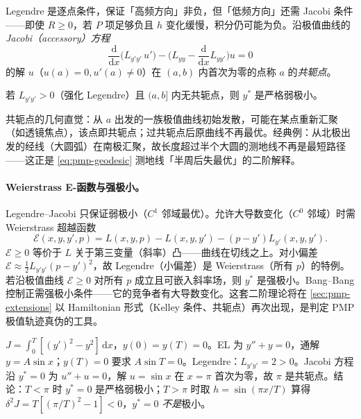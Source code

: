 Legendre 是逐点条件，保证「高频方向」非负，但「低频方向」还需 Jacobi 条件——即使 $R\ge0$，若 $P$ 项足够负且 $h$ 变化缓慢，积分仍可能为负。沿极值曲线的\emph{Jacobi（accessory）方程}
\begin{equation}
  \frac{\mathrm d}{\mathrm dx}\big(L_{y'y'}\,u'\big)-\Big(L_{yy}-\frac{\mathrm d}{\mathrm dx}L_{yy'}\Big)u=0
  \label{eq:pmp-jacobi}
\end{equation}
的解 $u$（$u(a)=0,u'(a)\ne0$）在 $(a,b)$ 内首次为零的点称 $a$ 的\emph{共轭点}。

\begin{theorem}\label{thm:pmp-jacobi}
若 $L_{y'y'}>0$（强化 Legendre）且 $(a,b]$ 内无共轭点，则 $y^\ast$ 是严格弱极小。
\end{theorem}

共轭点的几何直觉：从 $a$ 出发的一族极值曲线初始发散，可能在某点重新汇聚（如透镜焦点），该点即共轭点；过共轭点后原曲线不再最优。经典例：从北极出发的经线（大圆弧）在南极汇聚，故长度超过半个大圆的测地线不再是最短路径——这正是 \cref{eq:pmp-geodesic} 测地线「半周后失最优」的二阶解释。

\paragraph{Weierstrass E-函数与强极小。}
Legendre--Jacobi 只保证弱极小（$C^1$ 邻域最优）。允许大导数变化（$C^0$ 邻域）时需 Weierstrass 超越函数
\begin{equation}
  \mathcal E(x,y,y',p)=L(x,y,p)-L(x,y,y')-(p-y')L_{y'}(x,y,y').
  \label{eq:pmp-weierstrass}
\end{equation}
$\mathcal E\ge0$ 等价于 $L$ 关于第三变量（斜率）凸——曲线在切线之上。对小偏差 $\mathcal E\approx\tfrac12 L_{y'y'}(p-y')^2$，故 Legendre（小偏差）是 Weierstrass（所有 $p$）的特例。若沿极值曲线 $\mathcal E\ge0$ 对所有 $p$ 成立且可嵌入斜率场，则 $y^\ast$ 是强极小。Bang--Bang 控制正需强极小条件——它的竞争者有大导数变化。这套二阶理论将在 \cref{sec:pmp-extensions} 以 Hamiltonian 形式（Kelley 条件、共轭点）再次出现，是判定 PMP 极值轨迹真伪的工具。

\begin{example}[一道兼有共轭点的例题]\label{ex:pmp-conjugate}
$J=\int_0^T[(y')^2-y^2]\,\mathrm dx$，$y(0)=y(T)=0$。EL 为 $y''+y=0$，通解 $y=A\sin x$；$y(T)=0$ 要求 $A\sin T=0$。Legendre：$L_{y'y'}=2>0$。Jacobi 方程沿 $y^\ast=0$ 为 $u''+u=0$，解 $u=\sin x$ 在 $x=\pi$ 首次为零，故 $\pi$ 是共轭点。结论：$T<\pi$ 时 $y^\ast=0$ 是严格弱极小；$T>\pi$ 时取 $h=\sin(\pi x/T)$ 算得 $\delta^2 J=T[(\pi/T)^2-1]<0$，$y^\ast=0$ \emph{不是}极小。
\end{example}

